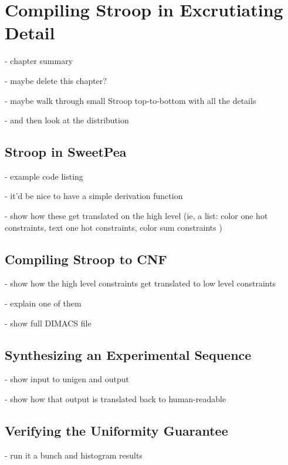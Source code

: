 \chapter{Compiling Stroop in Excrutiating Detail}

- chapter summary

- maybe delete this chapter?

- maybe walk through small Stroop top-to-bottom with all the details

- and then look at the distribution

\section{Stroop in SweetPea}

- example code listing

- it'd be nice to have a simple derivation function

- show how these get translated on the high level
(ie, a list: color one hot constraints, text one hot constraints, color sum constraints )


\section{Compiling Stroop to CNF}

- show how the high level constraints get translated to low level constraints

- explain one of them

- show full DIMACS file

\section{Synthesizing an Experimental Sequence}

- show input to unigen and output

- show how that output is translated back to human-readable


\section{Verifying the Uniformity Guarantee}

- run it a bunch and histogram results
